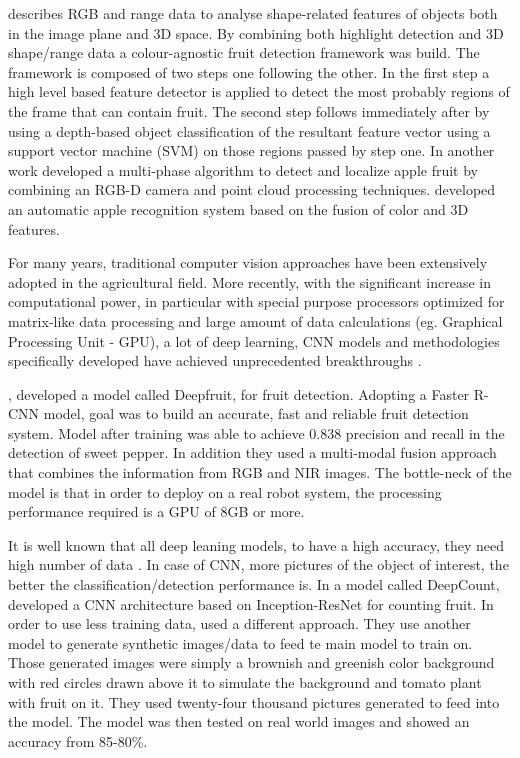 \documentclass[review]{elsarticle}
\begin{document}
    \cite{Barnea_2016} describes RGB and range data to analyse shape-related features of objects both in the image plane and 3D space. By combining both highlight detection and 3D shape/range data a colour-agnostic fruit detection framework was build. The framework is composed of two steps one following the other. In the first step a high level based feature detector is applied to detect the most probably regions of the frame that can contain fruit. The second step follows immediately after by using a depth-based object classification of the resultant feature vector using a support vector machine (SVM) on those regions passed by step one. In another work \cite{Nguyen2014AppleDA} developed a multi-phase algorithm to  detect and localize apple fruit by combining an RGB-D camera and point cloud processing techniques. \cite{Tao_2017} developed an automatic apple recognition system based on the fusion of color and 3D features.

    For many years, traditional computer vision approaches have been extensively adopted in the agricultural field. More recently, with the significant increase in computational power, in particular with special purpose processors optimized for matrix-like data processing and large amount of data calculations (eg. Graphical Processing Unit - GPU), a lot of deep learning, CNN models and methodologies specifically developed have achieved unprecedented breakthroughs \cite{LeCun2015}.

    \cite{Sa_2016}, developed a model called Deepfruit, for fruit detection. Adopting a Faster R-CNN model, goal was to build an accurate, fast and reliable fruit detection system. Model after training was able to achieve 0.838 precision and recall in the detection of sweet pepper. In addition they used a multi-modal fusion approach that combines the information from RGB and NIR images. The bottle-neck of the model is that in order to deploy on a real robot system, the processing performance required is a GPU of 8GB or more.

    It is well known that all deep leaning models, to have a high accuracy, they need high number of data \cite{Krizhevsky_2012}. In case of CNN, more pictures of the object of interest, the better the classification/detection performance is. In a model called DeepCount, \cite{Maryam_2017} developed a CNN architecture based on Inception-ResNet for counting fruit. In order to use less training data, \cite{Maryam_2017} used a different approach. They use another model to generate synthetic images/data to feed te main model to train on. Those generated images were simply a brownish and greenish color background with red circles drawn above it to simulate the background and tomato plant with fruit on it. They used twenty-four thousand pictures generated to feed into the model. The model was then tested on real world images and showed an accuracy from 85-80\%.
\end{document}
